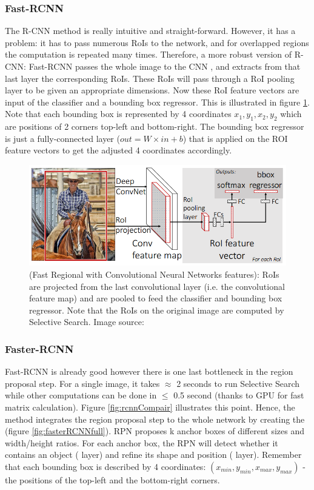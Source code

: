 \subsubsection{Fast-RCNN}
The R-CNN method is really intuitive and straight-forward. However, it has a problem: it has to pass numerous RoIs to the network, and for overlapped regions the computation is repeated many times. Therefore, a more robust version of R-CNN: Fast-RCNN \cite{DBLP:journals/corr/Girshick15} passes the whole image to the CNN , and extracts from that last layer the corresponding RoIs. These RoIs will pass through a RoI pooling layer to be given an appropriate dimensions. Now these RoI feature vectors are input of the classifier and a bounding box regressor. This is illustrated in figure \ref{fig:fastRCNN}. Note that each bounding box is represented by 4 coordinates $x_1, y_1, x_2, y_2$ which are positions of 2 corners top-left and bottom-right. The bounding box regressor is just a fully-connected layer ($out = W\times in + b$) that is applied on the ROI feature vectors to get the adjusted 4 coordinates accordingly.
\begin{figure}[tb]
	\centering
	\includegraphics[width=0.9\hsize]{./figures/fastRCNN}
	\caption{ (Fast Regional with Convolutional Neural Networks features): RoIs are projected from the last convolutional layer (i.e. the convolutional feature map) and are pooled to feed the classifier and bounding box regressor. Note that the RoIs on the original image are computed by Selective Search. Image source: \cite{DBLP:journals/corr/Girshick15}}
	\label{fig:fastRCNN}
\end{figure}

\subsubsection{Faster-RCNN}
Fast-RCNN is already good however there is one last bottleneck in the region proposal step. For a single image, it takes $\approx$ 2 seconds to run Selective Search while other computations can be done in $\leq$ 0.5 second (thanks to GPU for fast matrix calculation). Figure \ref{fig:rcnnCompair} illustrates this point. Hence, the  method \cite{DBLP:journals/corr/RenHG015} integrates the region proposal step to the whole network by creating the   (figure \ref{fig:fasterRCNNfull}). RPN proposes k anchor boxes of different sizes and width/height ratios. For each anchor box, the RPN will detect whether it contains an object ( layer) and refine its shape and position ( layer). Remember that each bounding box is described by 4 coordinates: $(x_{min}, y_{min}, x_{max}, y_{max})$ - the positions of the top-left and the bottom-right corners.

